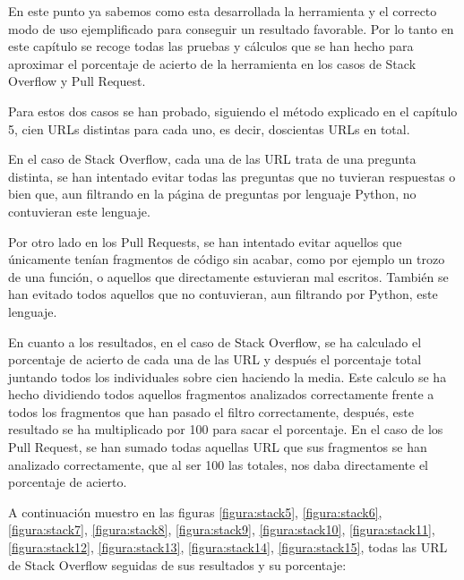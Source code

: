\documentclass[a4paper, 12pt]{book}
\begin{document}
En este punto ya sabemos como esta desarrollada la herramienta y el correcto modo de uso ejemplificado para conseguir un resultado favorable. Por lo tanto en este capítulo se recoge todas las pruebas y cálculos que se han hecho para aproximar el porcentaje de acierto de la herramienta en los casos de Stack Overflow y Pull Request. 

Para estos dos casos se han probado, siguiendo el método explicado en el capítulo 5, cien URLs distintas para cada uno, es decir, doscientas URLs en total.

En el caso de Stack Overflow, cada una de las URL trata de una pregunta distinta, se han intentado evitar todas las preguntas que no tuvieran respuestas o bien que, aun filtrando en la página de preguntas por lenguaje Python, no contuvieran este lenguaje.

Por otro lado en los Pull Requests, se han intentado evitar aquellos que únicamente tenían fragmentos de código sin acabar, como por ejemplo un trozo de una función, o aquellos que directamente estuvieran mal escritos. También se han evitado todos aquellos que no contuvieran, aun filtrando por Python, este lenguaje.

En cuanto a los resultados, en el caso de Stack Overflow, se ha calculado el porcentaje de acierto de cada una de las URL y después el porcentaje total juntando todos los individuales sobre cien haciendo la media. Este calculo se ha hecho dividiendo todos aquellos fragmentos analizados correctamente frente a todos los fragmentos que han pasado el filtro correctamente, después, este resultado se ha multiplicado por 100 para sacar el porcentaje. En el caso de los Pull Request, se han sumado todas aquellas URL que sus fragmentos se han analizado correctamente, que al ser 100 las totales, nos daba directamente el porcentaje de acierto.

A continuación muestro en las figuras \ref{figura:stack5}, \ref{figura:stack6}, \ref{figura:stack7}, \ref{figura:stack8}, \ref{figura:stack9}, \ref{figura:stack10}, \ref{figura:stack11}, \ref{figura:stack12}, \ref{figura:stack13}, \ref{figura:stack14}, \ref{figura:stack15}, todas las URL de Stack Overflow seguidas de sus resultados y su porcentaje:
\end{document}
